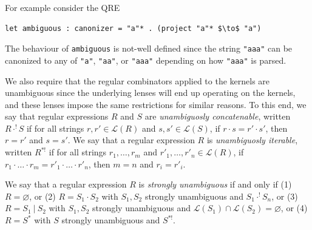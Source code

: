 \documentclass[acmsmall,review,anonymous]{acmart}\settopmatter{printfolios=true,printccs=false,printacmref=false}
\newcommand{\sep}{\ensuremath{\ | \ }}
\newcommand{\cd}[1]{\lstinline[backgroundcolor=\color{white}]$#1$}
\begin{document}
For example consider the QRE

\begin{lstlisting}
let ambiguous : canonizer = "a"* . (project "a"* $\to$ "a")
\end{lstlisting}

\noindent The behaviour of \cd{ambiguous} is not-well defined since the string
\cd{"aaa"} can be canonized to any of \cd{"a"}, \cd{"aa"}, or \cd{"aaa"} depending on how
\cd{"aaa"} is parsed.

We also require that the regular combinators applied to
the kernels are unambiguous since the underlying lenses will end up operating
on the kernels, and these lenses impose the same restrictions for similar
reasons.
%
To this end, we say that regular expressions $R$ and $S$ are
\textit{unambiguosly concatenable}, written $R \cdot^! S$ if for all strings
$r, r' \in \mathcal{L}(R)$ and $s, s' \in \mathcal{L}(S)$, if $r \cdot s = r'
\cdot s'$, then $r = r'$ and $s = s'$. We say that a regular expression $R$ is
\textit{unambiguosly iterable}, written $R^{*!}$ if for all strings $r_1,
\ldots, r_m$ and $r'_1, \ldots, r'_n \in \mathcal{L}(R)$, if $r_1 \cdot \ldots
\cdot r_m = r'_1 \cdot \ldots \cdot r'_n$, then $m = n$ and $r_i = r'_i$.

We say that a regular expression $R$ is \textit{strongly unambiguous} if and
only if (1) $R = \varnothing$, or (2) $R = S_1 \cdot S_2$ with $S_1, S_2$
strongly unambiguous and $S_1 \cdot^! S_n$, or (3) $R = S_1 \sep S_2$ with
$S_1, S_2$ strongly unambiguous and $\mathcal{L}(S_1) \cap \mathcal{L}(S_2) =
\varnothing$, or (4) $R = S^*$ with $S$ strongly unambiguous and $S^{*!}$.
\end{document}
